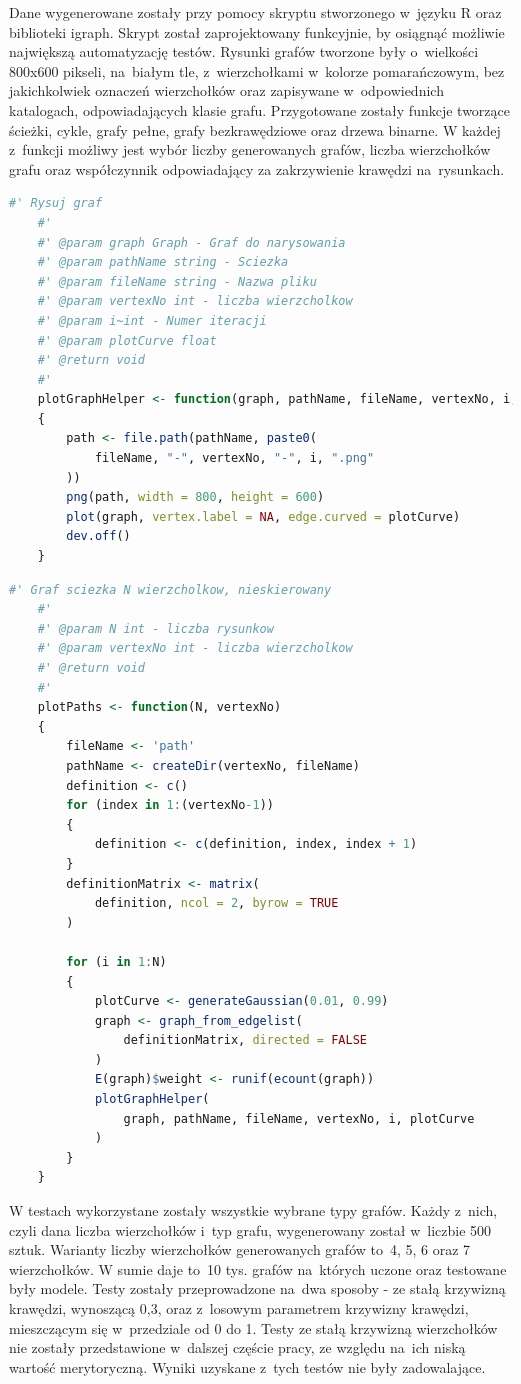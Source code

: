 Dane wygenerowane zostały przy pomocy skryptu stworzonego w~języku R oraz biblioteki igraph.
Skrypt został zaprojektowany funkcyjnie, by osiągnąć możliwie największą automatyzację testów.
Rysunki grafów tworzone były o~wielkości 800x600 pikseli, na~białym tle, z~wierzchołkami w~kolorze pomarańczowym,
bez jakichkolwiek oznaczeń wierzchołków oraz zapisywane w~odpowiednich katalogach, odpowiadających klasie grafu.
Przygotowane zostały funkcje tworzące ścieżki, cykle, grafy pełne, grafy bezkrawędziowe oraz drzewa binarne.
W każdej z~funkcji możliwy jest wybór liczby generowanych grafów, liczba wierzchołków grafu
oraz współczynnik odpowiadający za zakrzywienie krawędzi na~rysunkach.

\begin{lstlisting}[language=R,caption=Listing skryptu rysującego grafy,label={tests-generation-1}]
	#' Rysuj graf
	#'
	#' @param graph Graph - Graf do narysowania
	#' @param pathName string - Sciezka
	#' @param fileName string - Nazwa pliku
	#' @param vertexNo int - liczba wierzcholkow
	#' @param i~int - Numer iteracji
	#' @param plotCurve float
	#' @return void
	#'
	plotGraphHelper <- function(graph, pathName, fileName, vertexNo, i, plotCurve)
	{
		path <- file.path(pathName, paste0(
			fileName, "-", vertexNo, "-", i, ".png"
		))
		png(path, width = 800, height = 600)
		plot(graph, vertex.label = NA, edge.curved = plotCurve)
		dev.off()
	}	
\end{lstlisting}

\begin{lstlisting}[language=R,caption=Listing funkcji tworzącej ścieżkę,label={tests-generation-2}]
	#' Graf sciezka N wierzcholkow, nieskierowany
	#'
	#' @param N int - liczba rysunkow
	#' @param vertexNo int - liczba wierzcholkow
	#' @return void
	#'
	plotPaths <- function(N, vertexNo)
	{
		fileName <- 'path'
		pathName <- createDir(vertexNo, fileName)
		definition <- c()
		for (index in 1:(vertexNo-1))
		{
			definition <- c(definition, index, index + 1)
		}
		definitionMatrix <- matrix(
			definition, ncol = 2, byrow = TRUE
		)
		
		for (i in 1:N)
		{
			plotCurve <- generateGaussian(0.01, 0.99)
			graph <- graph_from_edgelist(
				definitionMatrix, directed = FALSE
			)
			E(graph)$weight <- runif(ecount(graph))
			plotGraphHelper(
				graph, pathName, fileName, vertexNo, i, plotCurve
			)
		}
	}
\end{lstlisting}

W testach wykorzystane zostały wszystkie wybrane typy grafów.
Każdy z~nich, czyli dana liczba wierzchołków i~typ grafu, wygenerowany został w~liczbie 500 sztuk.
Warianty liczby wierzchołków generowanych grafów to~4, 5, 6 oraz 7 wierzchołków.
W sumie daje to~10 tys. grafów na~których uczone oraz testowane były modele.
Testy zostały przeprowadzone na~dwa sposoby - ze stałą krzywizną krawędzi, wynoszącą 0,3,
oraz z~losowym parametrem krzywizny krawędzi, mieszczącym się w~przedziale od 0 do 1.
Testy ze stałą krzywizną wierzchołków nie zostały przedstawione w~dalszej częście pracy,
ze względu na~ich niską wartość merytoryczną. Wyniki uzyskane z~tych testów nie były zadowalające.

